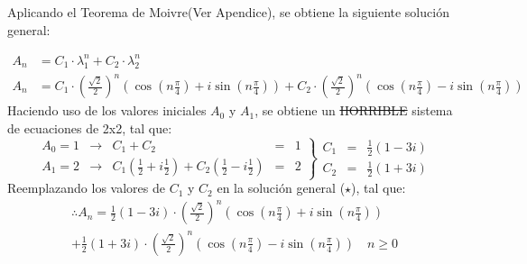 \begin{solution}
Aplicando el Teorema de Moivre(Ver Apendice), se obtiene la siguiente solución general:

\begin{align*}
    A_n &= C_1 \cdot \lambda_1^n + C_2 \cdot \lambda_2^n \\
    A_n  &= C_1 \cdot \left(\frac{\sqrt{2}}{2}\right)^n (\cos{\left( n\frac{\pi}{4} \right)}+i\sin{\left(n\frac{\pi}{4} \right)}) + C_2 \cdot \left(\frac{\sqrt{2}}{2}\right)^n(\cos{\left( n\frac{\pi}{4} \right)}-i\sin{\left(n\frac{\pi}{4} \right)}) \tag{$\star$}
\end{align*}
Haciendo uso de los valores iniciales $A_0$ y $A_1$, se obtiene un \st{HORRIBLE} sistema de ecuaciones de 2x2, tal que:
$$
  \left.
    \begin{array}{rcrrcr}
      A_0=1 &\rightarrow& C_1 + C_2 &=&1\\
      A_1=2 &\rightarrow& C_1(\frac{1}{2}+i\frac{1}{2})+C_2(\frac{1}{2}-i\frac{1}{2}) &=&2
      \end{array}
  \right\}
  \begin{array}{rcr}
       C_1&=& \frac{1}{2}(1-3i)  \\
       C_2&=& \frac{1}{2}(1+3i)
  \end{array}
$$
Reemplazando los valores de $C_1$ y $C_2$ en la solución general ($\star$), tal que:
\begin{multline*}
\therefore A_n = \frac{1}{2}(1-3i) \cdot \left(\frac{\sqrt{2}}{2}\right)^n (\cos{\left( n\frac{\pi}{4} \right)}+ i\sin{\left(n\frac{\pi}{4} \right)})\\
 +\frac{1}{2}(1+3i) \cdot \left(\frac{\sqrt{2}}{2}\right)^n(\cos{\left( n\frac{\pi}{4} \right)}-i\sin{\left(n\frac{\pi}{4} \right)}) \quad n\ge0
\end{multline*}
\end{solution}